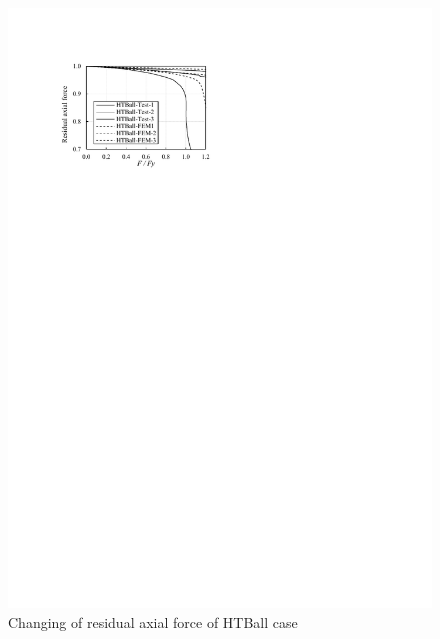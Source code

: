 \begin{figure}[htbp]
    \centering
    \begin{minipage}[t]{0.48\textwidth}
    \includegraphics[width=\linewidth]{imgs/ch4/figA6.pdf}
    \caption{Changing of residual axial force of HTBall case}
    \label{ch4figA6}
    \end{minipage}
    \begin{minipage}[t]{0.48\textwidth}
    \centering

\end{minipage}
\end{figure}
